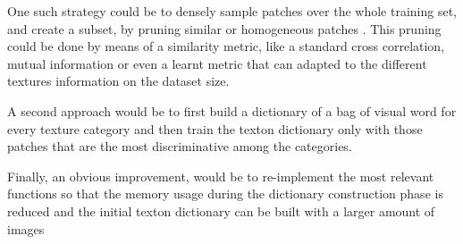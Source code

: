 \documentclass[10pt,twocolumn,letterpaper]{article}
\begin{document}
One such strategy could be to densely sample patches over the whole training set, and create a subset,  by pruning similar or homogeneous patches . This pruning could be done by means of a similarity  metric, like a standard cross correlation, mutual information or even a learnt metric that can adapted to the different textures information on the dataset size.

A second approach  would be to first build a dictionary of a bag of visual word  for  every texture category and then train the texton dictionary only with those patches that are the most discriminative among the categories.

Finally, an obvious improvement, would be to re-implement the most relevant functions so that the memory usage during the dictionary construction phase is reduced and the initial texton dictionary can be built with a larger amount of images


{\small


}
\end{document}
